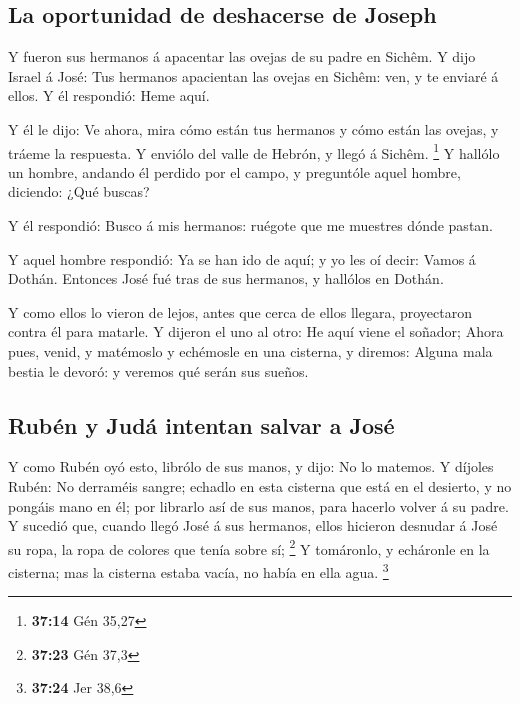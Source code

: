 \hypertarget{la-oportunidad-de-deshacerse-de-joseph}{%
\subsection{La oportunidad de deshacerse de
Joseph}\label{la-oportunidad-de-deshacerse-de-joseph}}

 Y fueron sus hermanos á apacentar las ovejas de su padre
en Sichêm.  Y dijo Israel á José: Tus hermanos apacientan
las ovejas en Sichêm: ven, y te enviaré á ellos. Y él respondió: Heme
aquí.

 Y él le dijo: Ve ahora, mira cómo están tus hermanos y
cómo están las ovejas, y tráeme la respuesta. Y enviólo del valle de
Hebrón, y llegó á Sichêm. \footnote{\textbf{37:14} Gén 35,27}
 Y hallólo un hombre, andando él perdido por el campo, y
preguntóle aquel hombre, diciendo: ¿Qué buscas?

 Y él respondió: Busco á mis hermanos: ruégote que me
muestres dónde pastan.

 Y aquel hombre respondió: Ya se han ido de aquí; y yo les
oí decir: Vamos á Dothán. Entonces José fué tras de sus hermanos, y
hallólos en Dothán.

 Y como ellos lo vieron de lejos, antes que cerca de ellos
llegara, proyectaron contra él para matarle.  Y dijeron el
uno al otro: He aquí viene el soñador;  Ahora pues, venid,
y matémoslo y echémosle en una cisterna, y diremos: Alguna mala bestia
le devoró: y veremos qué serán sus sueños.

\hypertarget{rubuxe9n-y-juduxe1-intentan-salvar-a-josuxe9}{%
\subsection{Rubén y Judá intentan salvar a
José}\label{rubuxe9n-y-juduxe1-intentan-salvar-a-josuxe9}}

 Y como Rubén oyó esto, librólo de sus manos, y dijo: No lo
matemos.  Y díjoles Rubén: No derraméis sangre; echadlo en
esta cisterna que está en el desierto, y no pongáis mano en él; por
librarlo así de sus manos, para hacerlo volver á su padre. 
Y sucedió que, cuando llegó José á sus hermanos, ellos hicieron desnudar
á José su ropa, la ropa de colores que tenía sobre sí; \footnote{\textbf{37:23}
  Gén 37,3}  Y tomáronlo, y echáronle en la cisterna; mas
la cisterna estaba vacía, no había en ella agua. \footnote{\textbf{37:24}
  Jer 38,6}

